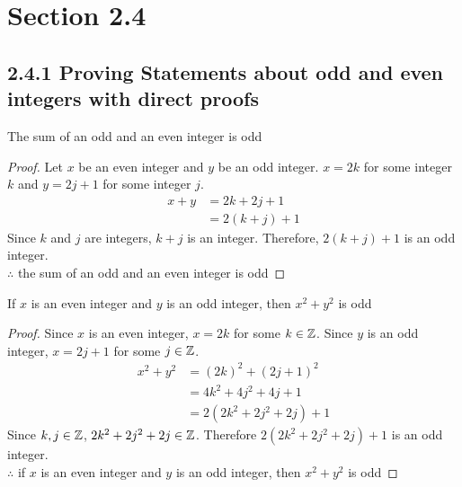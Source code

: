 





\section*{Section 2.4}

\subsection*{2.4.1 Proving Statements about odd and even integers with direct proofs}
\begin{enumerate}
   The sum of an odd and an even integer is odd
  \begin{proof}
    Let $x$ be an even integer and $y$ be an odd integer. $x=2k$ for some integer $k$ and $y=2j+1$ for some integer $j$.
    \begin{align*}
      x + y & = 2k + 2j +1 \\
            & = 2(k+j)+1
    \end{align*}
    Since $k$ and $j$ are integers, $k+j$ is an integer. Therefore, $2(k+j)+1$ is an odd integer. \\
    $\therefore$ the sum of an odd and an even integer is odd
  \end{proof}
   If $x$ is an even integer and $y$ is an odd integer, then $x^2+y^2$ is odd
  \begin{proof}
    Since $x$ is an even integer, $x = 2k$ for some $k \in \mathbb{Z}$.
    Since $y$ is an odd integer, $x = 2j + 1$ for some $j \in \mathbb{Z}$.
    \begin{align*}
      x^2+y^2 & = (2k)^2 + (2j+1)^2       \\
              & = 4k^2 + 4j^2 + 4j + 1    \\
              & = 2(2k^2 + 2j^2 + 2j) + 1
    \end{align*}
    Since $k,j \in \mathbb{Z}$, $2k^2 + 2j^2 + 2j \in \mathbb{Z}$. Therefore $2(2k^2 + 2j^2 + 2j) + 1$ is an odd integer. \\
    $\therefore$ if $x$ is an even integer and $y$ is an odd integer, then $x^2+y^2$ is odd
  \end{proof}
\end{enumerate}

